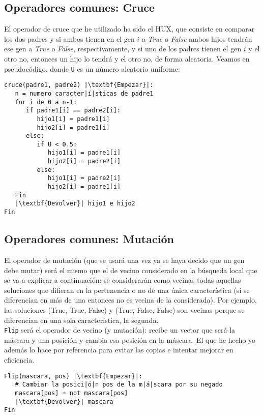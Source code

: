 \documentclass[12pt]{article}
\begin{document}
\subsection{Operadores comunes: Cruce}
El operador de cruce que he utilizado ha sido el HUX, que consiste en comparar los dos padres y si ambos tienen en el gen $i$ a \textit{True} o \textit{False} ambos hijos tendrán ese gen a \textit{True} o \textit{False}, respectivamente, y si uno de los padres tienen el gen $i$ y el otro no, entonces un hijo lo tendrá y el otro no, de forma aleatoria. Veamos en pseudocódigo, donde \texttt{U} es un número aleatorio uniforme:
\begin{lstlisting}
cruce(padre1, padre2) |\textbf{Empezar}|:
   n = numero caracter|í|sticas de padre1
   for i de 0 a n-1:
      if padre1[i] == padre2[i]:
         hijo1[i] = padre1[i]
         hijo2[i] = padre1[i]
      else:
         if U < 0.5:
            hijo1[i] = padre1[i]
            hijo2[i] = padre2[i]
         else:
            hijo1[i] = padre2[i]
            hijo2[i] = padre1[i]
   Fin
   |\textbf{Devolver}| hijo1 e hijo2
Fin
\end{lstlisting}

\subsection{Operadores comunes: Mutación}
El operador de mutación (que se usará una vez ya se haya decido que un gen debe mutar) será el mismo que el de vecino considerado en la búsqueda local que se va a explicar a continuación: se considerarán como vecinas todas aquellas soluciones que difieran en la pertenencia o no de una única característica (si se diferencian en más de una entonces no es vecina de la considerada). Por ejemplo, las soluciones (True, True, False) y (True, False, False) son vecinas porque se diferencian en una sola característica, la segunda.\\
\texttt{Flip} será el operador de vecino (y mutación): recibe un vector que será la máscara y una posición y cambia esa posición en la máscara. El que he hecho yo además lo hace por referencia para evitar las copias e intentar mejorar en eficiencia.\\

\begin{lstlisting}
Flip(mascara, pos) |\textbf{Empezar}|:
   # Cambiar la posici|ó|n pos de la m|á|scara por su negado 
   mascara[pos] = not mascara[pos]
   |\textbf{Devolver}| mascara
Fin
\end{lstlisting}
\end{document}
